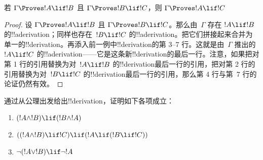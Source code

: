 \documentclass[../../../include/open-logic-section]{subfiles}
\begin{document}
\begin{prop}
   若 $\Gamma \Proves !A \lif !B$ 且 $\Gamma
  \Proves !B \lif !C$，则 $\Gamma \Proves !A \lif !C$
\end{prop}

\begin{proof}
  设 $\Gamma \Proves !A \lif !B$ 且 $\Gamma \Proves !B \lif
  !C$。那么由~$\Gamma$ 存在 $!A \lif !B$ 的!!a{derivation}；同样也存在~$!B \lif !C$ 的!!a{derivation}。把它们拼接起来合并为单一的!!{derivation}。再添入前一例中!!{derivation}的第 3--7 行。这就是由~$\Gamma$ 推出的 $!A \lif !C$ 的!!a{derivation}——它是这条新!!{derivation}的最后一行。注意，如果把对第 1 行的引用替换为对~$!A \lif !B$ 的!!{derivation}最后一行的引用，把对第 2 行的引用替换为对~$!B \lif !C$ 的!!{derivation}最后一行的引用，那么第 4 行与第~7 行的论证仍然有效。
\end{proof}

\begin{prob}
通过从公理出发给出!!{derivation}，证明如下各项成立：
\begin{enumerate}
\item $(!A \land !B) \lif (!B \land !A)$
\item $((!A \land !B) \lif !C) \lif (!A \lif (!B \lif !C))$
\item $\lnot(!A \lor !B) \lif \lnot !A$
\end{enumerate}
\end{prob}
\end{document}
